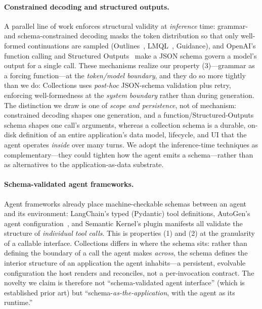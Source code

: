 \documentclass[11pt]{article}
\begin{document}
\paragraph{Constrained decoding and structured outputs.}
A parallel line of work enforces structural validity at \emph{inference} time:
grammar- and schema-constrained decoding masks the token distribution so that only
well-formed continuations are sampled (Outlines~\citep{willard2023outlines}, LMQL~\citep{beurerkellner2023lmql},
Guidance), and OpenAI's function calling and Structured
Outputs~\citep{openai2024structured} make a JSON schema govern a model's output for
a single call. These mechanisms realize our property
(3)---grammar as a forcing function---at the \emph{token/model boundary}, and they
do so more tightly than we do: Collections uses \emph{post-hoc} JSON-schema
validation plus retry, enforcing well-formedness at the \emph{system boundary}
rather than during generation. The distinction we draw is one of \emph{scope and
persistence}, not of mechanism: constrained decoding shapes one generation, and a
function/Structured-Outputs schema shapes one call's arguments, whereas a
collection schema is a durable, on-disk definition of an entire application's data
model, lifecycle, and UI that the agent operates \emph{inside} over many turns. We
adopt the inference-time techniques as complementary---they could tighten how the
agent emits a schema---rather than as alternatives to the application-as-data
substrate.

\paragraph{Schema-validated agent frameworks.}
Agent frameworks already place machine-checkable schemas between an agent and its
environment: LangChain's typed (Pydantic) tool definitions, AutoGen's agent
configuration~\citep{wu2023autogen}, and Semantic Kernel's plugin manifests all
validate the structure of \emph{individual tool calls}. This is properties (1) and
(2) at the granularity of a callable interface. Collections differs in where the
schema sits: rather than defining the boundary of a call the agent makes
\emph{across}, the schema defines the interior structure of an application the
agent inhabits---a persistent, evolvable configuration the host renders and
reconciles, not a per-invocation contract. The novelty we claim is therefore not
``schema-validated agent interface'' (which is established prior art) but
``schema-\emph{as-the-application}, with the agent as its runtime.''
\end{document}

